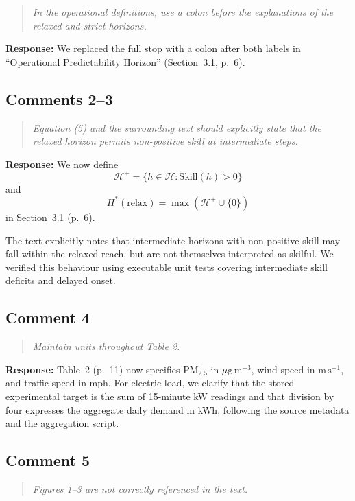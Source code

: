 \documentclass[11pt,a4paper]{article}
\newenvironment{reviewcomment}
  {\begin{quote}\itshape}
  {\end{quote}}
\newcommand{\response}{\noindent\textbf{Response:} }
\begin{document}
\begin{reviewcomment}
In the operational definitions, use a colon before the explanations of the
relaxed and strict horizons.
\end{reviewcomment}

\response
We replaced the full stop with a colon after both labels in
``Operational Predictability Horizon'' (Section~3.1, p.~6).


\subsection*{Comments 2--3}

\begin{reviewcomment}
Equation (5) and the surrounding text should explicitly state that the relaxed
horizon permits non-positive skill at intermediate steps.
\end{reviewcomment}

\response
We now define
\[
\mathcal{H}^{+}
=
\{h\in\mathcal{H}:\mathrm{Skill}(h)>0\}
\]
and
\[
H^*(\mathrm{relax})
=
\max\left(\mathcal{H}^{+}\cup\{0\}\right)
\]
in Section~3.1 (p.~6).

The text explicitly notes that intermediate horizons with non-positive skill
may fall within the relaxed reach, but are not themselves interpreted as
skilful. We verified this behaviour using executable unit tests covering
intermediate skill deficits and delayed onset.


\subsection*{Comment 4}

\begin{reviewcomment}
Maintain units throughout Table 2.
\end{reviewcomment}

\response
Table~2 (p.~11) now specifies PM$_{2.5}$ in $\mu\mathrm{g\,m^{-3}}$, wind speed in
$\mathrm{m\,s^{-1}}$, and traffic speed in mph. For electric load, we clarify that the
stored experimental target is the sum of 15-minute kW readings and that
division by four expresses the aggregate daily demand in kWh, following the source
metadata and the aggregation script.


\subsection*{Comment 5}

\begin{reviewcomment}
Figures 1--3 are not correctly referenced in the text.
\end{reviewcomment}
\end{document}
